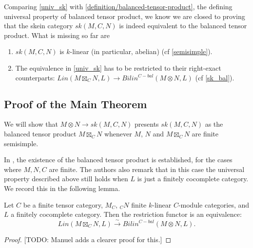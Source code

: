 \begin{remark}
  Comparing \ref{univ_sk} with \ref{definition/balanced-tensor-product}, the
  defining universal property of balanced tensor product, we know we are
  closed to proving that the skein category $sk(M,C,N)$ is indeed equivalent
  to the balanced tensor product. What is missing so far are

  \begin{enumerate}
    \item $sk(M,C,N)$ is $k$-linear (in particular, abelian) (cf \ref{semisimple}).
    \item The equivalence in \ref{univ_sk} has to be restricted to their
          right-exact counterparts:
          $Lin(M \boxtimes_{C} N, L) \to Bilin^{C-bal}(M \otimes N, L)$ (cf \ref{sk_bal}).
  \end{enumerate}
\end{remark}

\subsection{Proof of the Main Theorem}

We will show that $M\otimes N\to sk(M,C,N)$ presents $sk(M,C,N)$ as the
balanced tensor product $M\boxtimes_C N$ whenever $M$, $N$ and $M\boxtimes_C
N$ are finite semisimple.

In \cite{douglas/balanced-product}, the existence of the balanced tensor
product is established, for the cases where $M,N,C$ are finite. The authors
also remark that in this case the universal property described above still
holds when $L$ is just a finitely cocomplete category. We record this in the
following lemma.

\begin{lemma}\label{univ_box}
  Let $C$ be a finite tensor category, $M_C$, $_{C}N$ finite $k$-linear $C$-module
  categories, and $L$ a finitely cocomplete category. Then the restriction
  functor is an equivalence: \[Lin(M \boxtimes_{C} N, L) \xrightarrow{\sim} Bilin^{C-bal}(M \otimes N, L).\]
\end{lemma}

\begin{proof}
  \cite[Remark 3.4]{douglas/balanced-product} [TODO: Manuel adds a clearer
  proof for this.]
\end{proof}


